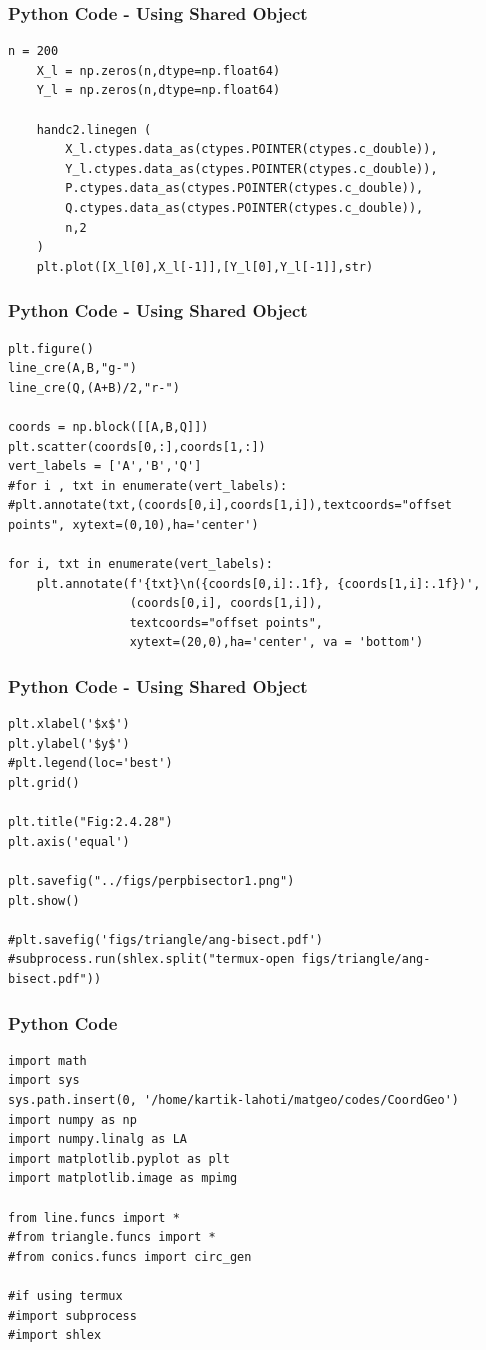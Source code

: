 \documentclass{beamer}
\begin{document}
\begin{frame}[fragile]
    \frametitle{Python Code - Using Shared Object}
    \begin{lstlisting}
n = 200
    X_l = np.zeros(n,dtype=np.float64)
    Y_l = np.zeros(n,dtype=np.float64)

    handc2.linegen (
        X_l.ctypes.data_as(ctypes.POINTER(ctypes.c_double)),
        Y_l.ctypes.data_as(ctypes.POINTER(ctypes.c_double)),
        P.ctypes.data_as(ctypes.POINTER(ctypes.c_double)),
        Q.ctypes.data_as(ctypes.POINTER(ctypes.c_double)),
        n,2
    )
    plt.plot([X_l[0],X_l[-1]],[Y_l[0],Y_l[-1]],str)
    \end{lstlisting}
\end{frame}

\begin{frame}[fragile]
    \frametitle{Python Code - Using Shared Object}
    \begin{lstlisting}
plt.figure()
line_cre(A,B,"g-")
line_cre(Q,(A+B)/2,"r-")

coords = np.block([[A,B,Q]])
plt.scatter(coords[0,:],coords[1,:])
vert_labels = ['A','B','Q']
#for i , txt in enumerate(vert_labels):
#plt.annotate(txt,(coords[0,i],coords[1,i]),textcoords="offset points", xytext=(0,10),ha='center')

for i, txt in enumerate(vert_labels):
    plt.annotate(f'{txt}\n({coords[0,i]:.1f}, {coords[1,i]:.1f})',
                 (coords[0,i], coords[1,i]),
                 textcoords="offset points",
                 xytext=(20,0),ha='center', va = 'bottom')

\end{lstlisting}
\end{frame}

\begin{frame}[fragile]
    \frametitle{Python Code - Using Shared Object}
    \begin{lstlisting}
plt.xlabel('$x$')
plt.ylabel('$y$')
#plt.legend(loc='best')
plt.grid()

plt.title("Fig:2.4.28")
plt.axis('equal')

plt.savefig("../figs/perpbisector1.png")
plt.show()

#plt.savefig('figs/triangle/ang-bisect.pdf')
#subprocess.run(shlex.split("termux-open figs/triangle/ang-bisect.pdf"))

\end{lstlisting}
\end{frame}

\begin{frame}[fragile]
    \frametitle{Python Code}
    \begin{lstlisting}
import math
import sys 
sys.path.insert(0, '/home/kartik-lahoti/matgeo/codes/CoordGeo')
import numpy as np
import numpy.linalg as LA
import matplotlib.pyplot as plt
import matplotlib.image as mpimg

from line.funcs import *
#from triangle.funcs import *
#from conics.funcs import circ_gen

#if using termux
#import subprocess
#import shlex

\end{lstlisting}
\end{frame}
\end{document}
